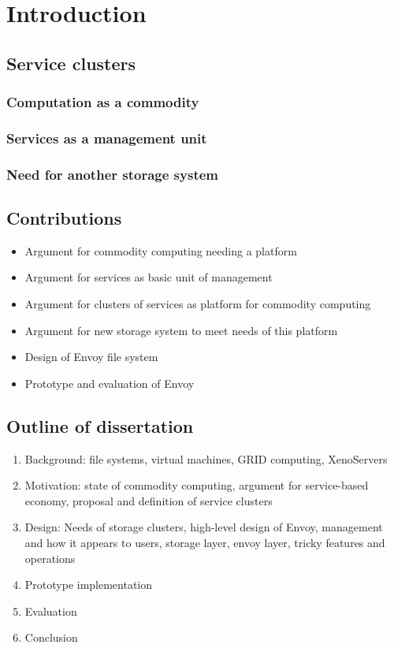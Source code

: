 \chapter{Introduction}

\section{Service clusters}

\subsection{Computation as a commodity}
\subsection{Services as a management unit}
\subsection{Need for another storage system}

\section{Contributions}
\begin{itemize}
\item Argument for commodity computing needing a platform
\item Argument for services as basic unit of management
\item Argument for clusters of services as platform for commodity computing
\item Argument for new storage system to meet needs of this platform
\item Design of Envoy file system
\item Prototype and evaluation of Envoy
\end{itemize}

\section{Outline of dissertation}
\begin{enumerate}
\item Background: file systems, virtual machines, GRID computing, XenoServers
\item Motivation: state of commodity computing, argument for service-based economy, proposal and definition of service clusters
\item Design: Needs of storage clusters, high-level design of Envoy, management and how it appears to users, storage layer, envoy layer, tricky features and operations
\item Prototype implementation
\item Evaluation
\item Conclusion
\end{enumerate}